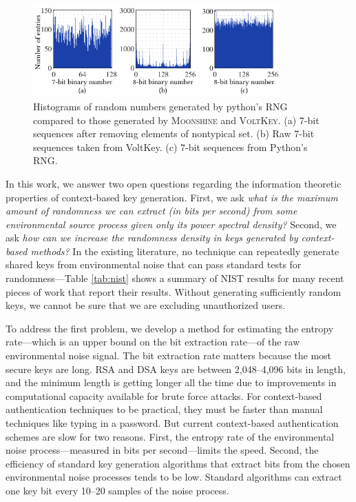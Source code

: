 \documentclass[10pt,onecolumn]{article}
\begin{document}

\begin{figure}
\centering
\includegraphics[width=3.75in]{figures/graph2.pdf}
\caption{Histograms of random numbers generated by python's RNG compared to those generated by \textsc{Moonshine} and \textsc{VoltKey}. (a) 7-bit sequences after removing elements of nontypical set. (b) Raw 7-bit sequences taken from VoltKey. (c) 7-bit sequences from Python's RNG.}
\label{fig:introduction}
\end{figure}


In this work, we answer two open questions regarding the information theoretic properties of context-based key generation.
First, we ask \emph{what is the maximum amount of randomness we can extract (in bits per second) from some environmental source process given only its power spectral density?}
Second, we ask \emph{how can we increase the randomness density in keys generated by context-based methods?}
In the existing literature, no technique can repeatedly generate shared keys from environmental noise that can pass standard tests for randomness---Table \ref{tab:nist} shows a summary of NIST results for many recent pieces of work that report their results.
Without generating sufficiently random keys, we cannot be sure that we are excluding unauthorized users.

To address the first problem, we develop a method for estimating the entropy rate---which is an upper bound on the bit extraction rate---of the raw environmental noise signal.
The bit extraction rate matters because the most secure keys are long.
RSA and DSA keys are between 2,048--4,096 bits in length, and the minimum length is getting longer all the time due to improvements in computational capacity available for brute force attacks.
For context-based authentication techniques to be practical, they must be faster than manual techniques like typing in a password.
But current context-based authentication schemes are slow for two reasons.
First, the entropy rate of the environmental noise process---measured in bits per second---limits the speed.
Second, the efficiency of standard key generation algorithms that extract bits from the chosen environmental noise processes tends to be low.
Standard algorithms can extract one key bit every 10--20 samples of the noise process.
\end{document}
